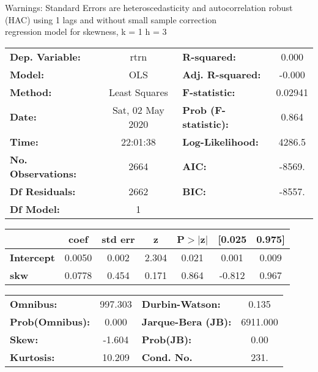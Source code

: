 Warnings: \newline
 [1] Standard Errors are heteroscedasticity and autocorrelation robust (HAC) using 1 lags and without small sample correction\\ 

regression model for skewness, k = 1 h = 3\begin{center}
\begin{tabular}{lclc}
\toprule
\textbf{Dep. Variable:}    &       rtrn       & \textbf{  R-squared:         } &     0.000   \\
\textbf{Model:}            &       OLS        & \textbf{  Adj. R-squared:    } &    -0.000   \\
\textbf{Method:}           &  Least Squares   & \textbf{  F-statistic:       } &   0.02941   \\
\textbf{Date:}             & Sat, 02 May 2020 & \textbf{  Prob (F-statistic):} &    0.864    \\
\textbf{Time:}             &     22:01:38     & \textbf{  Log-Likelihood:    } &    4286.5   \\
\textbf{No. Observations:} &        2664      & \textbf{  AIC:               } &    -8569.   \\
\textbf{Df Residuals:}     &        2662      & \textbf{  BIC:               } &    -8557.   \\
\textbf{Df Model:}         &           1      & \textbf{                     } &             \\
\bottomrule
\end{tabular}
\begin{tabular}{lcccccc}
                   & \textbf{coef} & \textbf{std err} & \textbf{z} & \textbf{P$> |$z$|$} & \textbf{[0.025} & \textbf{0.975]}  \\
\midrule
\textbf{Intercept} &       0.0050  &        0.002     &     2.304  &         0.021        &        0.001    &        0.009     \\
\textbf{skw}       &       0.0778  &        0.454     &     0.171  &         0.864        &       -0.812    &        0.967     \\
\bottomrule
\end{tabular}
\begin{tabular}{lclc}
\textbf{Omnibus:}       & 997.303 & \textbf{  Durbin-Watson:     } &    0.135  \\
\textbf{Prob(Omnibus):} &   0.000 & \textbf{  Jarque-Bera (JB):  } & 6911.000  \\
\textbf{Skew:}          &  -1.604 & \textbf{  Prob(JB):          } &     0.00  \\
\textbf{Kurtosis:}      &  10.209 & \textbf{  Cond. No.          } &     231.  \\
\bottomrule
\end{tabular}
\end{center}

